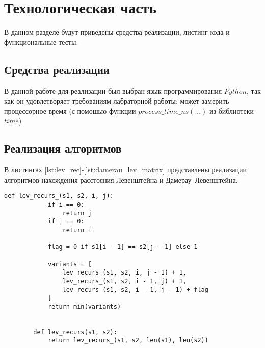 \chapter{Технологическая часть}
В данном разделе будут приведены средства реализации, листинг кода и функциональные тесты.

\section{Средства реализации}
В данной работе для реализации был выбран язык программирования $Python$\cite{python-city}, так как он удовлетворяет требованиям лабраторной работы: может замерить процессорное время (с помошью функции $process\_time\_ns(...)$ из библиотеки $time$\cite{python-time})

\section{Реализация алгоритмов}
В листингах \ref{lst:lev_rec}-\ref{lst:damerau_lev_matrix} представлены реализации алгоритмов нахождения расстояния Левенштейна и Дамерау--Левенштейна.

\begin{center}
	\captionsetup{justification=raggedright,singlelinecheck=off}
	\renewcommand{\lstlistingname}{Листинг}
	\begin{lstlisting}[label=lst:lev_rec,caption=Рекурсивный алгоритм нахождения расстояния Левенштейна]
		def lev_recurs_(s1, s2, i, j):
			if i == 0:
				return j
			if j == 0:
				return i
			
			flag = 0 if s1[i - 1] == s2[j - 1] else 1
			
			variants = [
				lev_recurs_(s1, s2, i, j - 1) + 1,
				lev_recurs_(s1, s2, i - 1, j) + 1,
				lev_recurs_(s1, s2, i - 1, j - 1) + flag
			]
			return min(variants)
		
		
		def lev_recurs(s1, s2):
			return lev_recurs_(s1, s2, len(s1), len(s2))
	\end{lstlisting}
\end{center}

